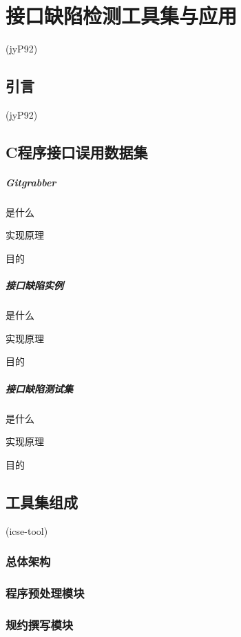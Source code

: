 \chapter{接口缺陷检测工具集与应用}
\label{cha:tools}

(jyP92)

\section{引言}
(jyP92)

\section{C程序接口误用数据集}

\paragraph{Gitgrabber}
是什么

实现原理

目的

\paragraph{接口缺陷实例}

是什么

实现原理

目的

\paragraph{接口缺陷测试集}

是什么

实现原理

目的

\section{工具集组成}
(icse-tool)
\subsection{总体架构}

\subsection{程序预处理模块}
\subsection{规约撰写模块}
